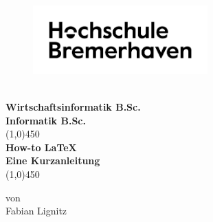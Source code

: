 \setmainfont{TeX Gyre Adventor}
\thispagestyle{empty}
\begin{figure}[h!]
	\centering
	\includegraphics[width=0.6\textwidth]{src/abbildungen/logoneu.png}
\end{figure}
\begin{center}
	\large\textbf{\department}\\
	\large\textbf{Wirtschaftsinformatik B.Sc.\\Informatik B.Sc.}\\
	\vspace{1cm}
	\vspace*{\fill}
	\line(1,0){450}\\
	\doublespacing
	\textbf{\Large{How-to \LaTeX}}\\
	\textbf{\large{Eine Kurzanleitung}}\\
	\line(1,0){450}\\
\end{center}
\vspace*{\fill}
\onehalfspacing
\begin{center}
	von\\
	Fabian Lignitz
\end{center}
\setmainfont{TeX Gyre Termes}